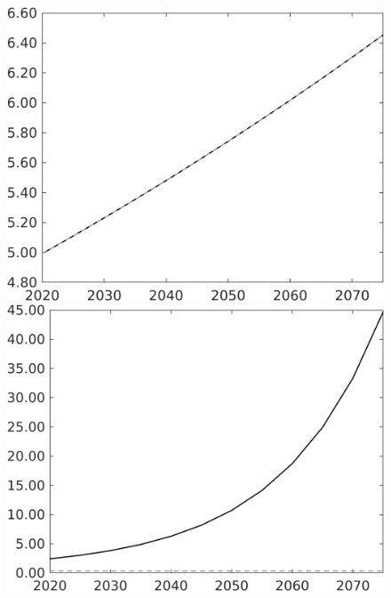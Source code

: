 \documentclass[12pt]{article}
\begin{document}
\begin{figure}
\begin{minipage}[]{0.32\textwidth}
\end{minipage}
\begin{minipage}[]{0.32\textwidth}
	\includegraphics[width=1\textwidth]{../../codding_model/own_basedOnFried/optimalPol_010922_revision/figures/all_13Sept22/LevTaufNoTauf_TaulCalib_Equlab_regime0_An_spillover0_nsk0_xgr1_knspil1_sep1_LFlimit0_emsbase0_countec0_GovRev0_etaa0.79_lgd0.png}
\end{minipage}
\begin{minipage}[]{0.32\textwidth}
	\includegraphics[width=1\textwidth]{../../codding_model/own_basedOnFried/optimalPol_010922_revision/figures/all_13Sept22/LevTaufNoTauf_TaulCalib_Equlab_regime0_LgLf_spillover0_nsk0_xgr1_knspil1_sep1_LFlimit0_emsbase0_countec0_GovRev0_etaa0.79_lgd0.png}
\end{minipage}

\end{figure}
\clearpage
\newpage
\end{document}
